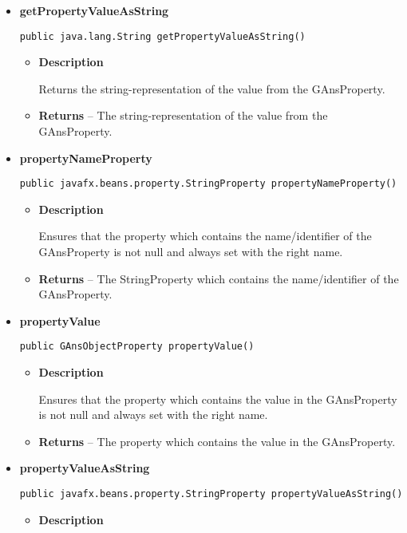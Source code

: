 {{{{{\begin{itemize}
{\begin{itemize}
{Returns the value of the GAnsProperty.
}
\item{{\bf  Returns} -- 
The value of the GAnsProperty. 
}%
\end{itemize}
}%
\item{ 
{\bf  getPropertyValueAsString}\\
\begin{lstlisting}[frame=none]
public java.lang.String getPropertyValueAsString()\end{lstlisting} %
\begin{itemize}
\item{
{\bf  Description}

Returns the string-representation of the value from the GAnsProperty.
}
\item{{\bf  Returns} -- 
The string-representation of the value from the GAnsProperty. 
}%
\end{itemize}
}%
\item{ 
{\bf  propertyNameProperty}\\
\begin{lstlisting}[frame=none]
public javafx.beans.property.StringProperty propertyNameProperty()\end{lstlisting} %
\begin{itemize}
\item{
{\bf  Description}

Ensures that the property which contains the name/identifier of the GAnsProperty is not null and always set with the right name.
}
\item{{\bf  Returns} -- 
The StringProperty which contains the name/identifier of the GAnsProperty. 
}%
\end{itemize}
}%
\item{ 
{\bf  propertyValue}\\
\begin{lstlisting}[frame=none]
public GAnsObjectProperty propertyValue()\end{lstlisting} %
\begin{itemize}
\item{
{\bf  Description}

Ensures that the property which contains the value in the GAnsProperty is not null and always set with the right name.
}
\item{{\bf  Returns} -- 
The property which contains the value in the GAnsProperty. 
}%
\end{itemize}
}%
\item{ 
{\bf  propertyValueAsString}\\
\begin{lstlisting}[frame=none]
public javafx.beans.property.StringProperty propertyValueAsString()\end{lstlisting} %
\begin{itemize}
\item{
{\bf  Description}

}
\end{itemize}}
\end{itemize}}}}}}
